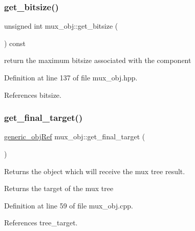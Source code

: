 \subsubsection{\texorpdfstring{get\+\_\+bitsize()}{get\_bitsize()}}
{\footnotesize\ttfamily unsigned int mux\+\_\+obj\+::get\+\_\+bitsize (\begin{DoxyParamCaption}{ }\end{DoxyParamCaption}) const\hspace{0.3cm}{\ttfamily [inline]}}



return the maximum bitsize associated with the component 



Definition at line 137 of file mux\+\_\+obj.\+hpp.



References bitsize.

\mbox{\label{classmux__obj_a42aaff6789a4c06f4c7158dad6215a4e}} 
\subsubsection{\texorpdfstring{get\+\_\+final\+\_\+target()}{get\_final\_target()}}
{\footnotesize\ttfamily \hyperlink{generic__obj_8hpp_acb533b2ef8e0fe72e09a04d20904ca81}{generic\+\_\+obj\+Ref} mux\+\_\+obj\+::get\+\_\+final\+\_\+target (\begin{DoxyParamCaption}{ }\end{DoxyParamCaption})}



Returns the object which will receive the mux tree result. 

\begin{DoxyReturn}{Returns}
the target of the mux tree 
\end{DoxyReturn}


Definition at line 59 of file mux\+\_\+obj.\+cpp.



References tree\+\_\+target.

\mbox{\label{classmux__obj_a92447354f70d65d66c3552ff1240df0a}} 

